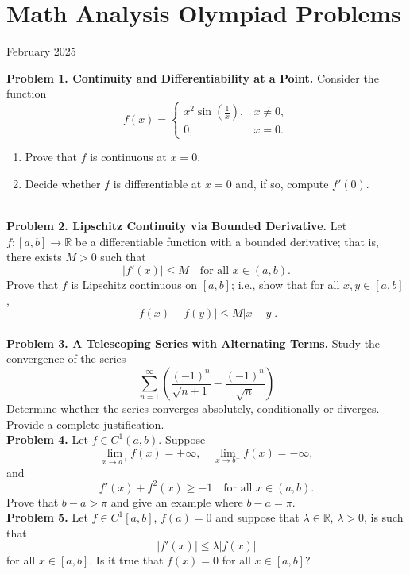 \documentclass{article}
\begin{document}
\pagestyle{plain}

\section*{Math Analysis Olympiad Problems}

\begin{center}
February 2025
\end{center}

\textbf{Problem 1. Continuity and Differentiability at a Point.}
Consider the function
\[
f(x) = \begin{cases}
x^2 \sin\left(\frac{1}{x}\right), & x\neq 0, \\
0, & x=0.
\end{cases}
\]
\begin{enumerate}
    \item Prove that \(f\) is continuous at \(x=0\).
    \item Decide whether \(f\) is differentiable at \(x=0\) and, if so, compute \(f'(0)\).
\end{enumerate}
\\

\textbf{Problem 2. Lipschitz Continuity via Bounded Derivative.}
Let \(f:[a,b]\to \mathbb{R}\) be a differentiable function with a bounded derivative; that is, there exists \(M>0\) such that
\[
    |f'(x)| \le M \quad \text{for all } x \in (a,b).
\]
Prove that \(f\) is Lipschitz continuous on \([a,b]\); i.e., show that for all \(x,y\in [a,b]\),
\[
    |f(x)-f(y)| \le M |x-y|.
\]
\\

\textbf{Problem 3. A Telescoping Series with Alternating Terms.}
Study the convergence of the series
    \[
    \sum_{n=1}^\infty \left( \frac{(-1)^n}{\sqrt{n+1}} - \frac{(-1)^n}{\sqrt{n}} \right)
    \]
Determine whether the series converges absolutely, conditionally or diverges.
Provide a complete justification.
\\

\textbf{Problem 4.}
Let $f \in C^1(a,b)$. Suppose
\[
\lim_{x \to a^+} f(x) = +\infty,
\quad
\lim_{x \to b^-} f(x) = -\infty,
\]
and
\[
  f'(x) + f^2(x) \ge -1
\quad
\text{for all } x \in (a,b).
\]
Prove that $b-a > \pi$ and give an example where $b-a = \pi$.
\\

\textbf{Problem 5.}
Let \( f \in C^1[a,b] \), \( f(a) = 0 \) and suppose that \( \lambda \in \mathbb{R} \), \( \lambda > 0 \), is such that
\[
|f'(x)| \leq \lambda |f(x)|
\]
for all \( x \in [a,b] \). Is it true that \( f(x) = 0 \) for all \( x \in [a,b] \)?
\\
\end{document}
